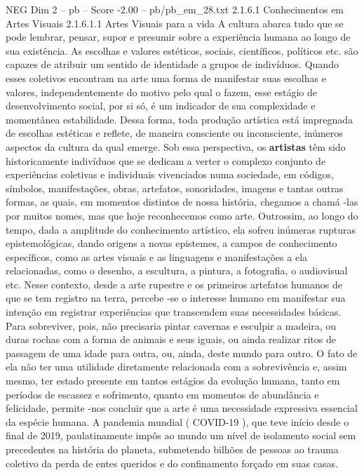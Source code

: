 \begin{textsample}{NEG Dim 2 – pb – Score -2.00 – pb/pb\_em\_28.txt}  \label{ex:f2_neg_010}
2.1.6.1 Conhecimentos em Artes Visuais 2.1.6.1.1 Artes Visuais para a vida A cultura abarca tudo que se pode lembrar, pensar, supor e presumir sobre a experiência humana ao longo de sua existência.
As escolhas e valores estéticos, sociais, científicos, políticos etc. são capazes de atribuir um sentido de identidade a grupos de indivíduos.
Quando esses coletivos encontram na arte uma forma de manifestar suas escolhas e valores, independentemente do motivo pelo qual o fazem, esse estágio de desenvolvimento social, por si só, é um indicador de sua complexidade e momentânea estabilidade.
Dessa forma, toda produção artística está impregnada de escolhas estéticas e reflete, de maneira consciente ou inconsciente, inúmeros aspectos da cultura da qual emerge.
Sob essa perspectiva, os \textbf{artistas} têm sido historicamente indivíduos que se dedicam a verter o complexo conjunto de experiências coletivas e individuais vivenciados numa sociedade, em códigos, símbolos, manifestações, obras, artefatos, sonoridades, imagens e tantas outras formas, as quais, em momentos distintos de nossa história, chegamos a chamá -las por muitos nomes, mas que hoje reconhecemos como arte.
Outrossim, ao longo do tempo, dada a amplitude do conhecimento artístico, ela sofreu inúmeras rupturas epistemológicas, dando origens a novas epistemes, a campos de conhecimento específicos, como as artes visuais e as linguagens e manifestações a ela relacionadas, como o desenho, a escultura, a pintura, a fotografia, o audiovisual etc.
Nesse contexto, desde a arte rupestre e os primeiros artefatos humanos de que se tem registro na terra, percebe -se o interesse humano em manifestar sua intenção em registrar experiências que transcendem suas necessidades básicas.
Para sobreviver, pois, não precisaria pintar cavernas e esculpir a madeira, ou duras rochas com a forma de animais e seus iguais, ou ainda realizar ritos de passagem de uma idade para outra, ou, ainda, deste mundo para outro.
O fato de ela não ter uma utilidade diretamente relacionada com a sobrevivência e, assim mesmo, ter estado presente em tantos estágios da evolução humana, tanto em períodos de escassez e sofrimento, quanto em momentos de abundância e felicidade, permite -nos concluir que a arte é uma necessidade expressiva essencial da espécie humana.
A pandemia mundial ( COVID-19 ), que teve início desde o final de 2019, paulatinamente impôs ao mundo um nível de isolamento social sem precedentes na história do planeta, submetendo bilhões de pessoas ao trauma coletivo da perda de entes queridos e do confinamento forçado em suas casas.

\end{textsample}
